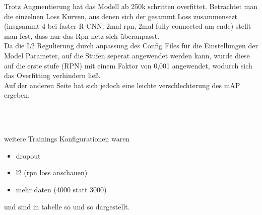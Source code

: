 Trotz Augmentierung hat das Modell ab 250k schritten overfittet.
Betrachtet man die einzelnen Loss Kurven, aus denen sich der gesammt 
Loss zusammensezt (insgsammt 4 bei faster R-CNN, 2mal rpn, 2mal fully connected am ende)
stellt man fest, dass nur das Rpn netz sich überanpasst.
\\
Da die L2 Regulierung durch anpassung des Config Files für die 
Einstellungen der Model Parameter, auf die Stufen seperat angewendet werden 
kann, wurde diese auf die erste stufe (RPN) mit einem Faktor von 0,001 
angewendet, wodurch sich das Overfitting verhindern ließ.
\\
Auf der anderen Seite hat sich jedoch eine leichte verschlechterung
des mAP ergeben.
\\[1cm]
\begin{minipage}{0.5\textwidth}
  \centering
  \def\svgwidth{0.9\textwidth}
  
  \label{}
\end{minipage}
\begin{minipage}{0.5\textwidth}
  \centering
  \def\svgwidth{0.9\textwidth}
  
  \label{}
\end{minipage}
\\[1cm]
\begin{minipage}{0.5\textwidth}
  \centering
  \def\svgwidth{0.9\textwidth}
  
  \label{}
\end{minipage}
\begin{minipage}{0.5\textwidth}
  \centering
  \def\svgwidth{0.9\textwidth}
  
  \label{}
\end{minipage}
\\[1cm]
weitere Trainings Konfigurationen waren
\begin{itemize}
  \item dropout
  \item l2 (rpn loss anschauen)
  \item mehr daten (4000 statt 3000)
\end{itemize}
und sind in tabelle so und so dargestellt.
%   
